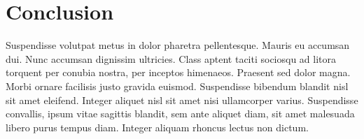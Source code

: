\section{Conclusion}

Suspendisse volutpat metus in dolor pharetra pellentesque. Mauris eu accumsan dui. Nunc accumsan dignissim ultricies. Class aptent taciti sociosqu ad litora torquent per conubia nostra, per inceptos himenaeos. Praesent sed dolor magna. Morbi ornare facilisis justo gravida euismod. Suspendisse bibendum blandit nisl sit amet eleifend. Integer aliquet nisl sit amet nisi ullamcorper varius. Suspendisse convallis, ipsum vitae sagittis blandit, sem ante aliquet diam, sit amet malesuada libero purus tempus diam. Integer aliquam rhoncus lectus non dictum.
